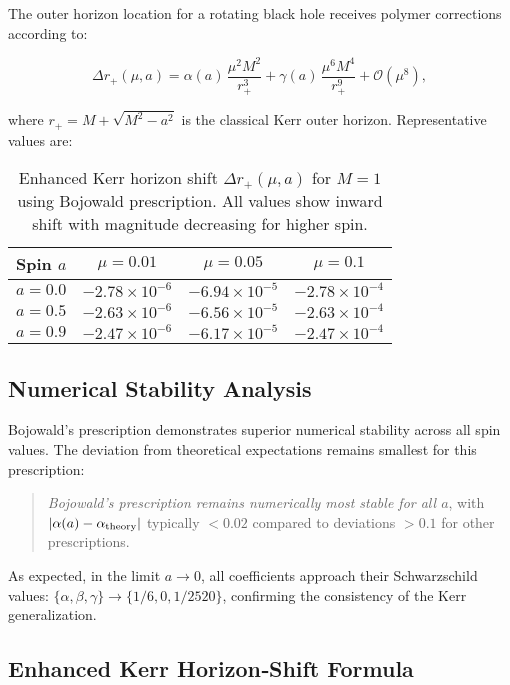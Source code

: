 \documentclass[11pt]{article}
\begin{document}
The outer horizon location for a rotating black hole receives polymer corrections according to:

\begin{equation}
\Delta r_+(\mu,a) = \alpha(a)\,\frac{\mu^2 M^2}{r_+^3} + \gamma(a)\,\frac{\mu^6 M^4}{r_+^9} + \mathcal{O}(\mu^8),
\end{equation}

where $r_+ = M + \sqrt{M^2 - a^2}$ is the classical Kerr outer horizon. Representative values are:

\begin{table}[h]
\centering
\begin{tabular}{|c|c|c|c|}
\hline
\textbf{Spin $a$} & \textbf{$\mu=0.01$} & \textbf{$\mu=0.05$} & \textbf{$\mu=0.1$} \\
\hline
$a=0.0$ & $-2.78 \times 10^{-6}$ & $-6.94 \times 10^{-5}$ & $-2.78 \times 10^{-4}$ \\
$a=0.5$ & $-2.63 \times 10^{-6}$ & $-6.56 \times 10^{-5}$ & $-2.63 \times 10^{-4}$ \\
$a=0.9$ & $-2.47 \times 10^{-6}$ & $-6.17 \times 10^{-5}$ & $-2.47 \times 10^{-4}$ \\
\hline
\end{tabular}
\caption{Enhanced Kerr horizon shift $\Delta r_+(\mu,a)$ for $M=1$ using Bojowald prescription. All values show inward shift with magnitude decreasing for higher spin.}
\end{table}

\subsection{Numerical Stability Analysis}

Bojowald's prescription demonstrates superior numerical stability across all spin values. The deviation from theoretical expectations remains smallest for this prescription:

\begin{quote}
\textit{Bojowald's prescription remains numerically most stable for all $a$}, with $|\alpha(a) - \alpha_{\rm theory}|$ typically $< 0.02$ compared to deviations $> 0.1$ for other prescriptions.
\end{quote}

As expected, in the limit $a \to 0$, all coefficients approach their Schwarzschild values: $\{\alpha,\beta,\gamma\} \to \{1/6,0,1/2520\}$, confirming the consistency of the Kerr generalization.

\subsection{Enhanced Kerr Horizon‐Shift Formula}
\end{document}
